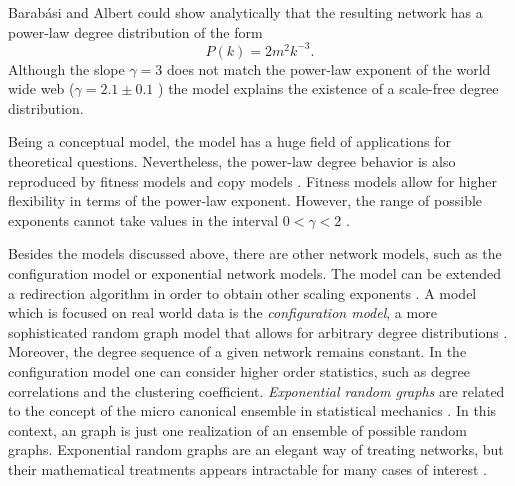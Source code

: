 Barab\'asi and Albert could show analytically that the resulting network has a power-law degree distribution of the form
\begin{equation}\label{eq:BA_law}
P(k)=2m^2 k^{-3}.
\end{equation}
Although the slope $\gamma = 3$ does not match the power-law exponent of the world wide web ($\gamma = 2.1\pm 0.1$ \citep{Barabasi99}) the model explains the existence of a scale-free degree distribution.

Being a conceptual model, the \BA model has a huge field of applications for theoretical questions.
Nevertheless, the power-law degree behavior is also reproduced by fitness models \citep{Bianconi:2001,Fortunato:2006} and copy models \citep{Kleinberg99theweb}.
Fitness models allow for higher flexibility in terms of the power-law exponent.
However, the range of possible exponents cannot take values in the interval $0<\gamma < 2$ \citep{all_scale_free_are_sparse}.

Besides the models discussed above, there are other network models, such as the configuration model or exponential network models.
The \BA model can be extended a redirection algorithm in order to obtain other scaling exponents \citep{Krapivsky:2001bg}.
A model which is focused on real world data is the \emph{configuration model}, a more sophisticated random graph model that allows for arbitrary degree distributions \citep{Newman:book,Newman:2001pa}.
Moreover, the degree sequence of a given network remains constant.
In the configuration model one can consider higher order statistics, such as degree correlations and the clustering coefficient.
\emph{Exponential random graphs} are related to the concept of the micro canonical ensemble in statistical mechanics \citep{Strauss:86}.
In this context, an \ER graph is just one realization of an ensemble of possible random graphs.
Exponential random graphs are an elegant way of treating networks, but their mathematical treatments appears intractable for many cases of interest \citep{Newman2003}.

